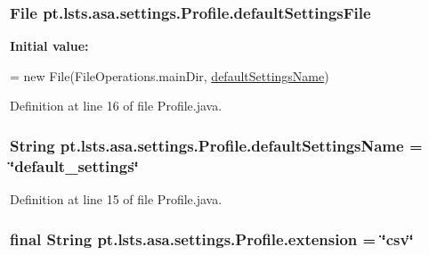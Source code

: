 \subsubsection[{default\+Settings\+File}]{\setlength{\rightskip}{0pt plus 5cm}File pt.\+lsts.\+asa.\+settings.\+Profile.\+default\+Settings\+File\hspace{0.3cm}{\ttfamily [static]}}\label{classpt_1_1lsts_1_1asa_1_1settings_1_1Profile_a2167ba64067e5386f3cd1242c2132538}
{\bfseries Initial value\+:}
\begin{DoxyCode}
= \textcolor{keyword}{new} File(FileOperations.mainDir,
            \hyperlink{classpt_1_1lsts_1_1asa_1_1settings_1_1Profile_a5ca440f54ce3ac78f7ea00ecd6cd16fe}{defaultSettingsName})
\end{DoxyCode}


Definition at line 16 of file Profile.\+java.

\hypertarget{classpt_1_1lsts_1_1asa_1_1settings_1_1Profile_a5ca440f54ce3ac78f7ea00ecd6cd16fe}{}
\subsubsection[{default\+Settings\+Name}]{\setlength{\rightskip}{0pt plus 5cm}String pt.\+lsts.\+asa.\+settings.\+Profile.\+default\+Settings\+Name = \char`\"{}default\+\_\+settings\char`\"{}\hspace{0.3cm}{\ttfamily [static]}}\label{classpt_1_1lsts_1_1asa_1_1settings_1_1Profile_a5ca440f54ce3ac78f7ea00ecd6cd16fe}


Definition at line 15 of file Profile.\+java.

\hypertarget{classpt_1_1lsts_1_1asa_1_1settings_1_1Profile_a436c9b9aa032eb20632476c9369d09fb}{}
\subsubsection[{extension}]{\setlength{\rightskip}{0pt plus 5cm}final String pt.\+lsts.\+asa.\+settings.\+Profile.\+extension = \char`\"{}csv\char`\"{}\hspace{0.3cm}{\ttfamily [static]}}\label{classpt_1_1lsts_1_1asa_1_1settings_1_1Profile_a436c9b9aa032eb20632476c9369d09fb}


